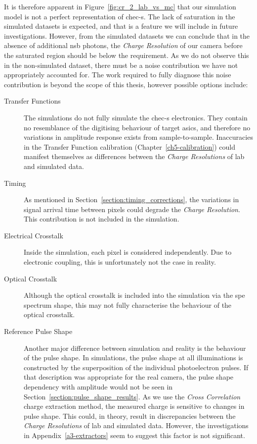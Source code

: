It is therefore apparent in Figure~\ref{fig:cr_2_lab_vs_mc} that our simulation model is not a perfect representation of \gls{chec-s}. The lack of saturation in the simulated datasets is expected, and that is a feature we will include in future investigations. However, from the simulated datasets we can conclude that in the absence of additional \gls{nsb} photons, the \textit{Charge Resolution} of our camera before the saturated region should be below the requirement. As we do not observe this in the non-simulated dataset, there must be a noise contribution we have not appropriately accounted for. The work required to fully diagnose this noise contribution is beyond the scope of this thesis, however possible options include:
\begin{description}
\item [Transfer Functions] The simulations do not fully simulate the \gls{chec-s} electronics. They contain no resemblance of the digitising behaviour of \gls{target} \glspl{asic}, and therefore no variations in amplitude response exists from sample-to-sample. Inaccuracies in the Transfer Function calibration (Chapter~\ref{ch5-calibration}) could manifest themselves as differences between the \textit{Charge Resolutions} of lab and simulated data.
\item [Timing] As mentioned in Section~\ref{section:timing_corrections}, the variations in signal arrival time between pixels could degrade the \textit{Charge Resolution}. This contribution is not included in the simulation.
\item [Electrical Crosstalk] Inside the simulation, each pixel is considered independently. Due to electronic coupling, this is unfortunately not the case in reality. 
\item [Optical Crosstalk] Although the optical crosstalk is included into the simulation via the \gls{spe} spectrum shape, this may not fully characterise the behaviour of the optical crosstalk. 
\item [Reference Pulse Shape] Another major difference between simulation and reality is the behaviour of the pulse shape. In simulations, the pulse shape at all illuminations is constructed by the superposition of the individual photoelectron pulses. If that description was appropriate for the real camera, the pulse shape dependency with amplitude would not be seen in Section~\ref{section:pulse_shape_results}. As we use the \textit{Cross Correlation} charge extraction method, the measured charge is sensitive to changes in pulse shape. This could, in theory, result in discrepancies between the \textit{Charge Resolutions} of lab and simulated data. However, the investigations in Appendix~\ref{a3-extractors} seem to suggest this factor is not significant.
\end{description}

